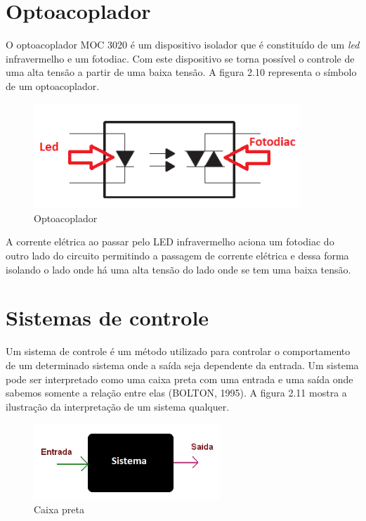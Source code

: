 \section{Optoacoplador}
O optoacoplador MOC 3020 é um dispositivo isolador que é constituído de um \textit{led} infravermelho e um fotodiac. Com este dispositivo se torna possível o controle de uma alta tensão a partir de uma baixa tensão. A figura 2.10 representa o símbolo de um optoacoplador.

\begin{figure}[h]

\center

\includegraphics[width=10cm]{imagens/optoaco.png}

\label{Optoacoplador}

\caption{Optoacoplador}

\end{figure}

A corrente elétrica ao passar pelo LED infravermelho aciona um fotodiac do outro lado do circuito permitindo a passagem de corrente elétrica e dessa forma isolando o lado onde há uma alta tensão do lado onde se tem uma baixa tensão.




\section{Sistemas de controle}

Um sistema de controle é um método utilizado para controlar o comportamento de um determinado sistema onde a saída seja dependente da entrada. Um sistema pode ser interpretado como uma caixa preta com uma entrada e uma saída onde sabemos somente a relação entre elas (BOLTON, 1995). A figura 2.11 mostra a ilustração da interpretação de um sistema qualquer. 

\begin{figure}[!htb]

\center

\includegraphics[width=7cm]{imagens/sistema_caixa_preta.jpg}

\label{Caixa preta}

\caption{Caixa preta}

\end{figure}

